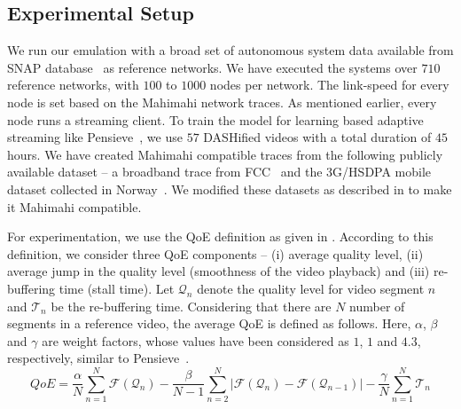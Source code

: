 \subsection{Experimental Setup}
We run our emulation with a broad set of autonomous system data available from \ac{SNAP} database~\cite{ASDataSet} as reference networks. We have executed the systems over $710$ reference networks, with $100$ to $1000$ nodes per network. The link-speed for every node is set based on the Mahimahi network traces. As mentioned earlier, every node runs a streaming client. To train the model for learning based adaptive streaming like Pensieve~\cite{mao2017neural}, we use $57$ DASHified videos with a total duration of $45$ hours.
We have created Mahimahi compatible traces from the following publicly available dataset -- a broadband trace from FCC~\cite{dataset-fcc} and the 3G/HSDPA mobile dataset collected in Norway~\cite{dataset-norway}. We modified these datasets as described in \cite{mao2017neural} to make it Mahimahi compatible.

For experimentation, we use the \ac{QoE} definition as given in \cite{mao2017neural}. According to this definition, we consider three \ac{QoE} components -- (i) average quality level, (ii) average jump in the quality level (smoothness of the video playback) and (iii) re-buffering time (stall time). Let $\mathcal{Q}_n$ denote the quality level for video segment $n$ and $\mathcal{T}_n$ be the re-buffering time. Considering that there are $N$ number of segments in a reference video, the average \ac{QoE} is defined as follows. Here, $\alpha$, $\beta$ and $\gamma$ are weight factors, whose values have been considered as $1$, $1$ and $4.3$, respectively, similar to Pensieve~\cite{mao2017neural}.
\begin{equation}
QoE = \frac{\alpha}{N}\sum_{n=1}^{N} \mathcal{F}(\mathcal{Q}_n) - \frac{\beta}{N-1} \sum_{n=2}^{N}\lvert\mathcal{F}(\mathcal{Q}_n) -\mathcal{F}(\mathcal{Q}_{n-1})\rvert - \frac{\gamma}{N}\sum_{n=1}^{N}\mathcal{T}_n
\label{eqn:chap06:QoE}
\end{equation}

